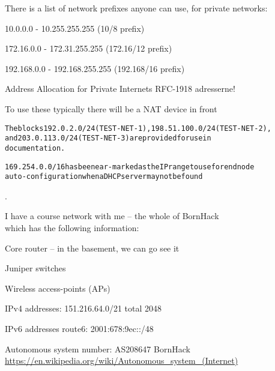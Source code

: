 \documentclass[Screen16to9,17pt]{foils}
\begin{document}

\begin{list1}
\item There is a list of network prefixes anyone can use, for private networks:
\begin{list2}
\item 10.0.0.0    -  10.255.255.255  (10/8 prefix)
\item 172.16.0.0  -  172.31.255.255  (172.16/12 prefix)
\item 192.168.0.0 -  192.168.255.255 (192.168/16 prefix)
\end{list2}
\item Address Allocation for Private Internets RFC-1918 adresserne!
\item To use these typically there will be a NAT device in front
\end{list1}

\begin{alltt}
The blocks 192.0.2.0/24 (TEST-NET-1), 198.51.100.0/24 (TEST-NET-2),
and 203.0.113.0/24 (TEST-NET-3) are provided for use in
documentation.

169.254.0.0/16 has been ear-marked as the IP range to use for end node
auto-configuration when a DHCP server may not be found
\end{alltt}



.

\begin{list1}
\item I have a course network with me -- the whole of BornHack \smiley\\
which has the following information:
\begin{list2}
\item Core router -- in the basement, we can go see it
\item Juniper switches
\item Wireless access-points (APs)
\item IPv4 addresses: 151.216.64.0/21 total 2048
\item IPv6 addresses route6: 2001:678:9ec::/48
\item Autonomous system number: AS208647 BornHack\\
\url{https://en.wikipedia.org/wiki/Autonomous_system_(Internet)}

\end{list2}
\end{list1}
\end{document}
